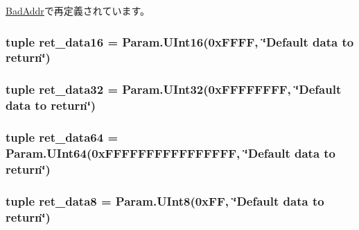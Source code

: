 \hyperlink{classDevice_1_1BadAddr_afe050af66b0ed365423418f0163f2e10}{BadAddr}で再定義されています。\hypertarget{classDevice_1_1IsaFake_acd1683745d1a271a2424cb01d910d9ae}{
\subsubsection[{ret\_\-data16}]{\setlength{\rightskip}{0pt plus 5cm}tuple {\bf ret\_\-data16} = Param.UInt16(0xFFFF, \char`\"{}Default data to return\char`\"{})}}
\label{classDevice_1_1IsaFake_acd1683745d1a271a2424cb01d910d9ae}
\hypertarget{classDevice_1_1IsaFake_a34a8200017f783980e0cb2eb33332555}{
\subsubsection[{ret\_\-data32}]{\setlength{\rightskip}{0pt plus 5cm}tuple {\bf ret\_\-data32} = Param.UInt32(0xFFFFFFFF, \char`\"{}Default data to return\char`\"{})}}
\label{classDevice_1_1IsaFake_a34a8200017f783980e0cb2eb33332555}
\hypertarget{classDevice_1_1IsaFake_a12fa416b983e8963f54bfb92995b6707}{
\subsubsection[{ret\_\-data64}]{\setlength{\rightskip}{0pt plus 5cm}tuple {\bf ret\_\-data64} = Param.UInt64(0xFFFFFFFFFFFFFFFF, \char`\"{}Default data to return\char`\"{})}}
\label{classDevice_1_1IsaFake_a12fa416b983e8963f54bfb92995b6707}
\hypertarget{classDevice_1_1IsaFake_ab96c3091d240ed1b0dffe8dc116caae7}{
\subsubsection[{ret\_\-data8}]{\setlength{\rightskip}{0pt plus 5cm}tuple {\bf ret\_\-data8} = Param.UInt8(0xFF, \char`\"{}Default data to return\char`\"{})}}
